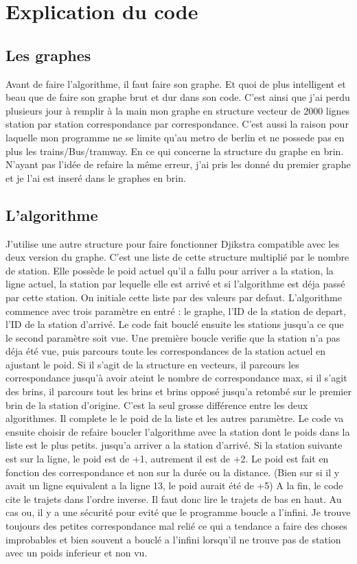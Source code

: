 \section{Explication du code}
\subsection{Les graphes}

Avant de faire l'algorithme, il faut faire son graphe. Et quoi de plus intelligent et beau que de faire son graphe brut et dur dans son code. C'est ainsi que j'ai perdu plusieurs jour à remplir à la main mon graphe en structure vecteur de 2000 lignes station par station correspondance par correspondance. C'est aussi la raison pour laquelle mon programme ne se limite qu'au metro de berlin et ne possede pas en plus les trains/Bus/tramway.
\smallbreak
En ce qui concerne la structure du graphe en brin. N'ayant pas l'idée de refaire la même erreur, j'ai pris les donné du premier graphe et je l'ai est inseré dans le graphes en brin.

\subsection{L'algorithme}
J'utilise une autre structure pour faire fonctionner Djikstra compatible avec les deux version du graphe. C'est une liste de cette structure multiplié par le nombre de station. Elle possède le poid actuel qu'il a fallu pour arriver a la station, la ligne actuel, la station par lequelle elle est arrivé et si l'algorithme est déja passé par cette station.
On initiale cette liste par des valeurs par defaut.
\smallbreak
L'algorithme commence avec trois paramètre en entré : le graphe, l'ID de la station de depart, l'ID de la station d'arrivé. Le code fait bouclé ensuite les stations jusqu'a ce que le second paramètre soit vue.
\smallbreak
Une première boucle verifie que la station n'a pas déja été vue, puis parcours toute les correspondances de la station actuel en ajustant le poid. Si il s'agit de la structure en vecteurs, il parcours les correspondance jusqu'à avoir ateint le nombre de correspondance max, si il s'agit des brins, il parcours tout les brins et brins opposé jusqu'a retombé sur le premier brin de la station d'origine. C'est la seul grosse différence entre les deux algorithmes.
Il complete le le poid de la liste et les autres paramètre. Le code va ensuite choisir de refaire boucler l'algorithme avec la station dont le poids dans la liste est le plus petits. jusqu'a arriver a la station d'arrivé.
Si la station suivante est sur la ligne, le poid est de +1, autrement il est de +2. Le poid est fait en fonction des correspondance et non sur la durée ou la distance. (Bien sur si il y avait un ligne equivalent a la ligne 13, le poid aurait été de +5)
A la fin, le code cite le trajets dans l'ordre inverse. Il faut donc lire le trajets de bas en haut.
Au cas ou, il y a une sécurité pour evité que le programme boucle a l'infini. Je trouve toujours des petites correspondance mal relié ce qui a tendance a faire des choses improbables et bien souvent a bouclé a l'infini lorsqu'il ne trouve pas de station avec un poids inferieur et non vu.

